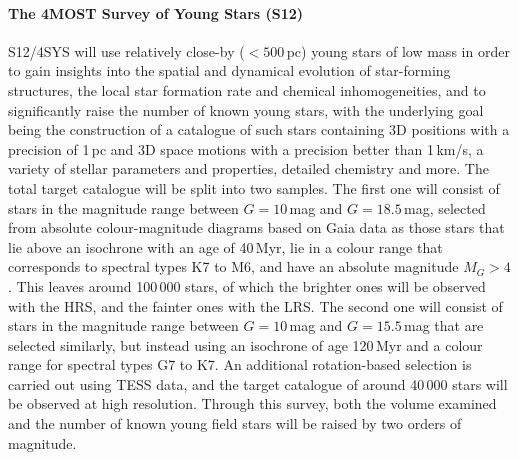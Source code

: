 \documentclass[a4paper,11pt]{article}
\begin{document}
\paragraph{The 4MOST Survey of Young Stars (S12)}
S12/4SYS \citep{4mosts12} will use relatively close-by (${<}500$\,pc) young stars of low mass in order to gain insights into the spatial and dynamical evolution of star-forming structures, the local star formation rate and chemical inhomogeneities, and to significantly raise the number of known young stars, with the underlying goal being the construction of a catalogue of such stars containing 3D positions with a precision of 1\,pc and 3D space motions with a precision better than 1\,km/s, a variety of stellar parameters and properties, detailed chemistry and more. The total target catalogue will be split into two samples. The first one will consist of stars in the magnitude range between $G=10$\,mag and $G=18.5$\,mag, selected from absolute colour-magnitude diagrams based on Gaia data as those stars that lie above an isochrone with an age of 40\,Myr, lie in a colour range that corresponds to spectral types K7 to M6, and have an absolute magnitude $M_G>4$. This leaves around 100\,000 stars, of which the brighter ones will be observed with the HRS, and the fainter ones with the LRS. The second one will consist of stars in the magnitude range between $G=10$\,mag and $G=15.5$\,mag that are selected similarly, but instead using an isochrone of age 120\,Myr and a colour range for spectral types G7 to K7. An additional rotation-based selection is carried out using TESS data, and the target catalogue of around 40\,000 stars will be observed at high resolution. Through this survey, both the volume examined and the number of known young field stars will be raised by two orders of magnitude.
%
\end{document}
